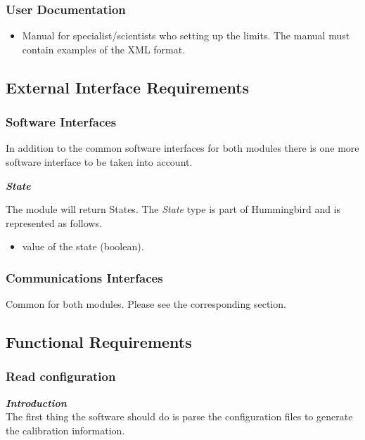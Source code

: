 \subsubsection{User Documentation}
\begin{itemize}
\item Manual for specialist/scientists who setting up the limits. The manual must contain examples of the XML format.
\end{itemize}
\pagebreak
\subsection{External Interface Requirements}

\subsubsection{Software Interfaces}

In addition to the common software interfaces for both modules there is one more software interface to be taken into account.

\textbf{\emph{State}}

The module will return States. The \emph{State} type is part of Hummingbird and is represented as follows.

\begin{itemize}
\item value of the state (boolean).

\end{itemize}


\subsubsection{Communications Interfaces}

Common for both modules. Please see the corresponding section.

\subsection{Functional Requirements}

\subsubsection{Read configuration}

\textbf{\emph{Introduction}}\\
The first thing the software should do is parse the configuration files to generate the calibration information.

